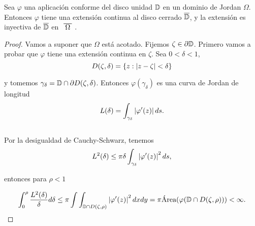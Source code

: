 \begin{theorem}
    \label{th:caratheodory}
    Sea $\varphi$ una aplicación conforme del disco unidad $\mathbb{D}$ en un dominio de Jordan $\Omega$. Entonces $\varphi$ tiene una extensión continua al disco cerrado $\overline{\mathbb{D}}$, y la extensión es inyectiva de $\overline{\mathbb{D}}$ en $\xbar{\Omega}$.
\end{theorem}

\begin{proof}
    Vamos a suponer que $\Omega$ está acotado. Fijemos $\zeta \in \partial \mathbb{D}$. Primero vamos a probar que $\varphi$ tiene una extensión continua en $\zeta$. Sea $0 < \delta < 1$,
    \begin{equation*}
        D(\zeta, \delta) = \{z: \left\lvert z - \zeta\right\rvert < \delta \}
    \end{equation*}

    y tomemos $\gamma_{\delta} = \mathbb{D} \cap \partial D(\zeta, \delta)$. Entonces $\varphi (\gamma_{\delta})$ es una curva de Jordan de longitud
    \begin{equation*}
        L(\delta) = \int_{\gamma_{\delta}} \left\lvert\varphi ' (z)\right\rvert ds.
    \end{equation*}
    \\
    Por la desigualdad de Cauchy-Schwarz, tenemos
    \begin{equation*}
        L^2(\delta) \leq \pi \delta \int_{\gamma_{\delta}} \left\lvert\varphi ' (z)\right\rvert^2 ds,
    \end{equation*}

    entonces para $\rho < 1$

    \begin{equation*}
        \int_{0}^{\rho} \frac{L^2(\delta)}{\delta} d\delta \leq \pi \int \int_{\mathbb{D} \cap D(\zeta, \rho)} \left\lvert\varphi ' (z)\right\rvert^2 dxdy = \pi \text{Área}(\varphi(\mathbb{D} \cap D(\zeta, \rho))) < \infty.
    \end{equation*}


\end{proof}
